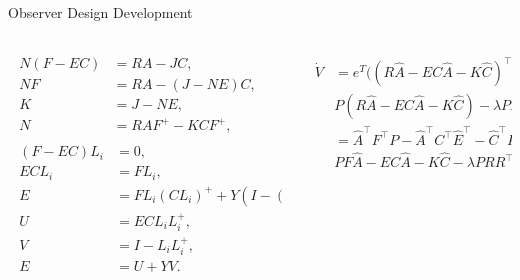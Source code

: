 \begin{slide}{Observer Design Development}
  \begin{columns}[c]
    \begin{column}{0.55\textwidth}
      \begin{align}
        \begin{split}
          N(F-EC) & = RA-JC,                               \\
          NF      & = RA-(J-NE)C,                          \\
          K       & = J-NE,                                \\
          N       & = RAF^{+}-KCF^{+},
        \end{split} \\
        \begin{split}
          (F-EC)L_{i} & = 0,                                              \\
          ECL_{i}     & = FL_{i},                                         \\
          E           & = FL_{i}(CL_{i})^{+} + Y(I-(CL_{i})(CL_{i})^{+}), \\
          U           & = ECL_{i}L_{i}^{+},                               \\
          V           & = I-L_{i}L_{i}^{+},                               \\
          E           & = U+YV.
        \end{split}
      \end{align}
    \end{column}%
    \hfill%
    \begin{column}{0.55\textwidth}
      \begin{align}
        \begin{split}
          \dot{V} & = e^{T}((R\hat{A} - EC\hat{A} - K\hat{C})^{\top}P +                                         \\
          & P(R\hat{A} - EC\hat{A} - K\hat{C}) - \lambda{}PRR^{\top}P - \lambda{}I)e.                   \\
          & = \hat{A}^{\top}F^{\top}P - \hat{A}^{\top}C^{\top}\hat{E}^{\top} - \hat{C}^{\top}K^{\top} + \\
          & PF\hat{A} - \hat{E}C\hat{A} - K\hat{C} - \lambda{}PRR^{\top}P - \lambda{}I.
        \end{split}
      \end{align}
    \end{column}%
  \end{columns}
\end{slide}

